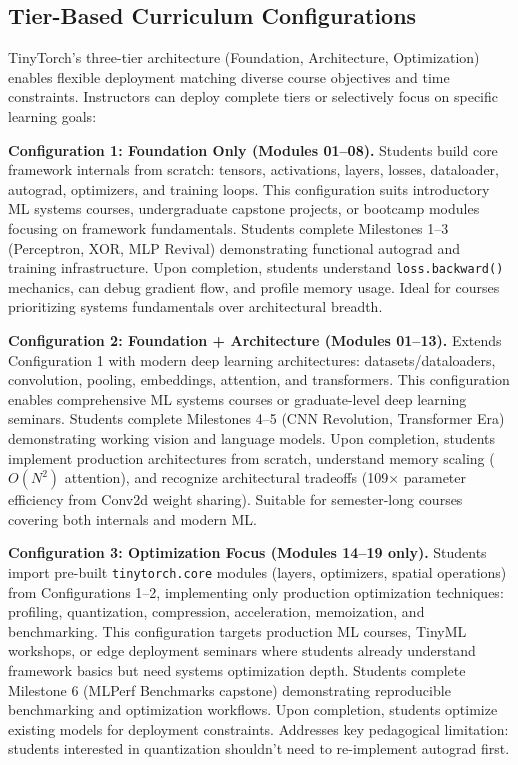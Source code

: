 \documentclass[10pt,twocolumn]{article}
\begin{document}
\subsection{Tier-Based Curriculum Configurations}
\label{subsec:tier-configs}

TinyTorch's three-tier architecture (Foundation, Architecture, Optimization) enables flexible deployment matching diverse course objectives and time constraints. Instructors can deploy complete tiers or selectively focus on specific learning goals:

\textbf{Configuration 1: Foundation Only (Modules 01--08).} Students build core framework internals from scratch: tensors, activations, layers, losses, dataloader, autograd, optimizers, and training loops. This configuration suits introductory ML systems courses, undergraduate capstone projects, or bootcamp modules focusing on framework fundamentals. Students complete Milestones 1--3 (Perceptron, XOR, MLP Revival) demonstrating functional autograd and training infrastructure. Upon completion, students understand \texttt{loss.backward()} mechanics, can debug gradient flow, and profile memory usage. Ideal for courses prioritizing systems fundamentals over architectural breadth.

\textbf{Configuration 2: Foundation + Architecture (Modules 01--13).} Extends Configuration 1 with modern deep learning architectures: datasets/dataloaders, convolution, pooling, embeddings, attention, and transformers. This configuration enables comprehensive ML systems courses or graduate-level deep learning seminars. Students complete Milestones 4--5 (CNN Revolution, Transformer Era) demonstrating working vision and language models. Upon completion, students implement production architectures from scratch, understand memory scaling ($O(N^2)$ attention), and recognize architectural tradeoffs (109$\times$ parameter efficiency from Conv2d weight sharing). Suitable for semester-long courses covering both internals and modern ML.

\textbf{Configuration 3: Optimization Focus (Modules 14--19 only).} Students import pre-built \texttt{tinytorch.core} modules (layers, optimizers, spatial operations) from Configurations 1--2, implementing only production optimization techniques: profiling, quantization, compression, acceleration, memoization, and benchmarking. This configuration targets production ML courses, TinyML workshops, or edge deployment seminars where students already understand framework basics but need systems optimization depth. Students complete Milestone 6 (MLPerf Benchmarks capstone) demonstrating reproducible benchmarking and optimization workflows. Upon completion, students optimize existing models for deployment constraints. Addresses key pedagogical limitation: students interested in quantization shouldn't need to re-implement autograd first.
\end{document}
